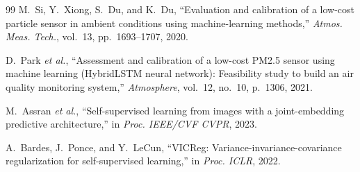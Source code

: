 \documentclass[journal]{IEEEtran}
\begin{document}
\begin{thebibliography}{99}
 M.~Si, Y.~Xiong, S.~Du, and K.~Du, ``Evaluation and calibration of a low-cost particle sensor in
ambient conditions using machine-learning methods,'' \emph{Atmos. Meas. Tech.}, vol.~13, pp.~1693--1707, 2020.

 D.~Park \emph{et al.}, ``Assessment and calibration of a low-cost PM2.5 sensor using machine
learning (HybridLSTM neural network): Feasibility study to build an air quality monitoring system,''
\emph{Atmosphere}, vol.~12, no.~10, p.~1306, 2021.

 M.~Assran \emph{et al.}, ``Self-supervised learning from images with a joint-embedding predictive
architecture,'' in \emph{Proc. IEEE/CVF CVPR}, 2023.

 A.~Bardes, J.~Ponce, and Y.~LeCun, ``VICReg: Variance-invariance-covariance regularization for
self-supervised learning,'' in \emph{Proc. ICLR}, 2022.

\end{thebibliography}
\end{document}
